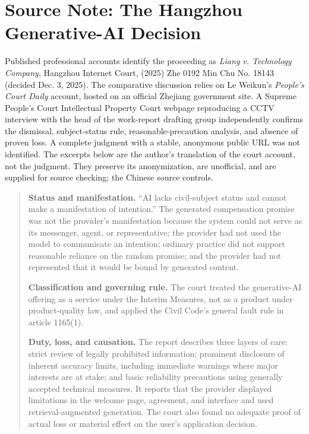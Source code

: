 \section*{Source Note: The Hangzhou Generative-AI Decision}

Published professional accounts identify the proceeding as \emph{Liang v. Technology Company}, Hangzhou Internet Court, (2025) Zhe 0192 Min Chu No. 18143 (decided Dec. 3, 2025). The comparative discussion relies on Le Weikun's \emph{People's Court Daily} account, hosted on an official Zhejiang government site. A Supreme People's Court Intellectual Property Court webpage reproducing a CCTV interview with the head of the work-report drafting group independently confirms the dismissal, subject-status rule, reasonable-precaution analysis, and absence of proven loss. A complete judgment with a stable, anonymous public URL was not identified. The excerpts below are the author's translation of the court account, not the judgment. They preserve its anonymization, are unofficial, and are supplied for source checking; the Chinese source controls.

\begin{quote}
\small
\textbf{Status and manifestation.} ``AI lacks civil-subject status and cannot make a manifestation of intention.'' The generated compensation promise was not the provider's manifestation because the system could not serve as its messenger, agent, or representative; the provider had not used the model to communicate an intention; ordinary practice did not support reasonable reliance on the random promise; and the provider had not represented that it would be bound by generated content.

\textbf{Classification and governing rule.} The court treated the generative-AI offering as a service under the Interim Measures, not as a product under product-quality law, and applied the Civil Code's general fault rule in article 1165(1).

\textbf{Duty, loss, and causation.} The report describes three layers of care: strict review of legally prohibited information; prominent disclosure of inherent accuracy limits, including immediate warnings where major interests are at stake; and basic reliability precautions using generally accepted technical measures. It reports that the provider displayed limitations in the welcome page, agreement, and interface and used retrieval-augmented generation. The court also found no adequate proof of actual loss or material effect on the user's application decision.
\end{quote}
